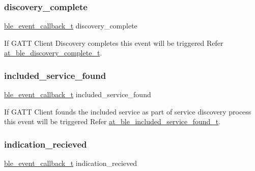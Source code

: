 \subsubsection{\texorpdfstring{discovery\_complete}{discovery\_complete}}
{\footnotesize\ttfamily \mbox{\hyperlink{ble__manager_8h_a04ce4bb8cb8282f2762e3924b1773cc9}{ble\+\_\+event\+\_\+callback\+\_\+t}} discovery\+\_\+complete}



If G\+A\+TT Client Discovery completes this event will be triggered Refer \mbox{\hyperlink{at__ble__api_8h_ad6fbc03cf1f09d166dd381a805a42e9c}{at\+\_\+ble\+\_\+discovery\+\_\+complete\+\_\+t}}. 

\mbox{\label{structble__gatt__client__event__cb_a4436e1c9a54d9c532281ca67c28827f8}} 
\subsubsection{\texorpdfstring{included\_service\_found}{included\_service\_found}}
{\footnotesize\ttfamily \mbox{\hyperlink{ble__manager_8h_a04ce4bb8cb8282f2762e3924b1773cc9}{ble\+\_\+event\+\_\+callback\+\_\+t}} included\+\_\+service\+\_\+found}



If G\+A\+TT Client founds the included service as part of service discovery process this event will be triggered Refer \mbox{\hyperlink{structat__ble__included__service__found__t}{at\+\_\+ble\+\_\+included\+\_\+service\+\_\+found\+\_\+t}}. 

\mbox{\label{structble__gatt__client__event__cb_a0d5f5f9e4cf80206d91a6b0ad93145dd}} 
\subsubsection{\texorpdfstring{indication\_recieved}{indication\_recieved}}
{\footnotesize\ttfamily \mbox{\hyperlink{ble__manager_8h_a04ce4bb8cb8282f2762e3924b1773cc9}{ble\+\_\+event\+\_\+callback\+\_\+t}} indication\+\_\+recieved}



